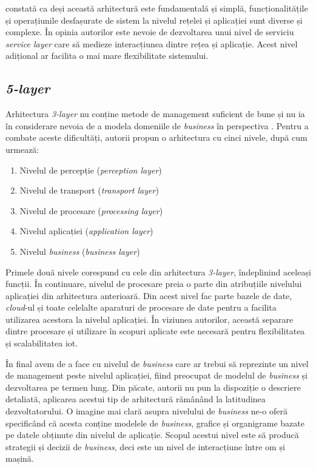 \cite{Lin2017} constată ca deși această arhitectură este fundamentală și simplă, funcționalitățile și operațiunile desfașurate de sistem la nivelul rețelei și aplicației sunt diverse și complexe. În opinia autorilor este nevoie de dezvoltarea unui nivel de serviciu \textit{service layer} care să medieze interacțiunea dintre rețea și aplicație. Acest nivel adițional ar facilita o mai mare flexibilitate sistemului.

\subsection{\textit{5-layer}}

Arhitectura \textit{3-layer} nu conține metode de management suficient de bune și nu ia în considerare nevoia de a modela domeniile de \textit{business} în perspectiva \cite{MiaoWu2010}. Pentru a combate aceste dificultăți, autorii propun o arhitectura cu cinci nivele, după cum urmează:

\begin{enumerate}
    \item Nivelul de percepție (\textit{perception layer})
    \item Nivelul de transport (\textit{transport layer})
    \item Nivelul de procesare (\textit{processing layer})
    \item Nivelul aplicației (\textit{application layer})
    \item Nivelul \textit{business} (\textit{business layer})
\end{enumerate}

Primele două nivele corespund cu cele din arhitectura \textit{3-layer}, îndeplinind aceleași funcții. În continuare, nivelul de procesare preia o parte din atribuțiile nivelului aplicației din arhitectura anterioară. Din acest nivel fac parte bazele de date, \textit{cloud}-ul și toate celelalte aparaturi de procesare de date pentru a facilita utilizarea acestora la nivelul aplicației. În viziunea autorilor, această separare dintre procesare și utilizare în scopuri aplicate este necesară pentru flexibilitatea și scalabilitatea \acrshort{iot}.

În final avem de a face cu nivelul de \textit{business} care ar trebui să reprezinte un nivel de management peste nivelul aplicației, fiind preocupat de modelul de \textit{business} și dezvoltarea pe termen lung. Din păcate, autorii nu pun la dispoziție o descriere detaliată, aplicarea acestui tip de arhitectură rămânând la latitudinea dezvoltatorului. O imagine mai clară asupra nivelului de \textit{business} ne-o oferă \cite{Khan2012} specificând că acesta conține modelele de \textit{business}, grafice și organigrame bazate pe datele obținute din nivelul de aplicație. Scopul acestui nivel este să producă strategii și decizii de \textit{business}, deci este un nivel de interacțiune între om și mașină.

